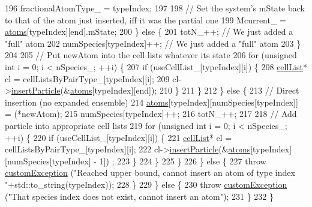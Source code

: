 \begin{DoxyCode}
196                     fractionalAtomType\_ = typeIndex;
197 
198                     \textcolor{comment}{// Set the system's mState back to that of the atom just inserted, iff it was the
       partial one}
199                     Mcurrent\_ = \hyperlink{classsim_system_a90421b19082f7fb8fc23b7264b1161e4}{atoms}[typeIndex][end].mState;
200                 \} \textcolor{keywordflow}{else} \{
201                     totN\_++; \textcolor{comment}{// We just added a "full" atom}
202                     numSpecies[typeIndex]++; \textcolor{comment}{// We just added a "full" atom}
203                 \}
204 
205                 \textcolor{comment}{// Put newAtom into the cell lists whatever its state}
206                 \textcolor{keywordflow}{for} (\textcolor{keywordtype}{unsigned} \textcolor{keywordtype}{int} i = 0; i < nSpecies\_; ++i) \{
207                     \textcolor{keywordflow}{if} (useCellList\_[typeIndex][i]) \{
208                         \hyperlink{classcell_list}{cellList}* cl = cellListsByPairType\_[typeIndex][i];
209                         cl->\hyperlink{classcell_list_a56c0012eed483e47248f9065bfc70fce}{insertParticle}(&\hyperlink{classsim_system_a90421b19082f7fb8fc23b7264b1161e4}{atoms}[typeIndex][end]);
210                     \}
211                 \}
212             \} \textcolor{keywordflow}{else} \{
213                 \textcolor{comment}{// Direct insertion (no expanded ensemble)}
214                 \hyperlink{classsim_system_a90421b19082f7fb8fc23b7264b1161e4}{atoms}[typeIndex][numSpecies[typeIndex]] = (*newAtom);
215                 numSpecies[typeIndex]++;
216                 totN\_++;
217 
218                 \textcolor{comment}{// Add particle into appropriate cell lists}
219                 \textcolor{keywordflow}{for} (\textcolor{keywordtype}{unsigned} \textcolor{keywordtype}{int} i = 0; i < nSpecies\_; ++i) \{
220                     \textcolor{keywordflow}{if} (useCellList\_[typeIndex][i]) \{
221                         \hyperlink{classcell_list}{cellList}* cl = cellListsByPairType\_[typeIndex][i];
222                         cl->\hyperlink{classcell_list_a56c0012eed483e47248f9065bfc70fce}{insertParticle}(&\hyperlink{classsim_system_a90421b19082f7fb8fc23b7264b1161e4}{atoms}[typeIndex][numSpecies[typeIndex] - 1])
      ;
223                     \}
224                 \}
225             \}
226         \} \textcolor{keywordflow}{else} \{
227             \textcolor{keywordflow}{throw} \hyperlink{classcustom_exception}{customException} (\textcolor{stringliteral}{"Reached upper bound, cannot insert an atom of type index
       "}+std::to\_string(typeIndex));
228         \}
229     \} \textcolor{keywordflow}{else} \{
230         \textcolor{keywordflow}{throw} \hyperlink{classcustom_exception}{customException} (\textcolor{stringliteral}{"That species index does not exist, cannot insert an atom"});
231     \}
232 \}
\end{DoxyCode}

